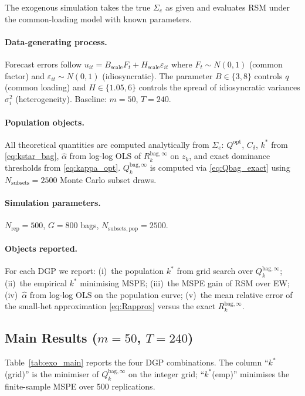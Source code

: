 \documentclass[12pt,a4paper]{article}
\theoremstyle{definition}
\begin{document}
The exogenous simulation takes the true $\Sigma_e$ as given and evaluates
RSM under the common-loading model with known parameters.

\paragraph{Data-generating process.}
Forecast errors follow $u_{it}=B_{\mathrm{scale}}F_t+H_{\mathrm{scale}}\varepsilon_{it}$
where $F_t\sim N(0,1)$ (common factor) and $\varepsilon_{it}\sim N(0,1)$
(idiosyncratic). The parameter $B\in\{3,8\}$ controls $q$ (common loading)
and $H\in\{1.05,6\}$ controls the spread of idiosyncratic variances
$\sigma_i^2$ (heterogeneity). Baseline: $m=50$, $T=240$.

\paragraph{Population objects.}
All theoretical quantities are computed analytically from $\Sigma_e$:
$Q^{\mathrm{opt}}$, $C_\delta$, $k^*$ from \eqref{eq:kstar_bag},
$\hat\alpha$ from log-log OLS of $R_k^{\mathrm{bag},\infty}$ on $z_k$,
and exact dominance thresholds from \eqref{eq:kappa_opt}.
$Q_k^{\mathrm{bag},\infty}$ is computed via \eqref{eq:Qbag_exact} using
$N_{\mathrm{subsets}}=2500$ Monte Carlo subset draws.

\paragraph{Simulation parameters.}
$N_{\mathrm{rep}}=500$, $G=800$ bags, $N_{\mathrm{subsets,pop}}=2500$.

\paragraph{Objects reported.}
For each DGP we report: (i)~the population $k^*$ from grid search over
$Q_k^{\mathrm{bag},\infty}$; (ii)~the empirical $k^*$ minimising MSPE;
(iii)~the MSPE gain of RSM over EW; (iv)~$\hat\alpha$ from log-log OLS
on the population curve; (v)~the mean relative error of the small-het
approximation \eqref{eq:Rapprox} versus the exact $R_k^{\mathrm{bag},\infty}$.

\subsection{Main Results ($m=50$, $T=240$)}

Table~\ref{tab:exo_main} reports the four DGP combinations. The column
``$k^*$(grid)'' is the minimiser of $Q_k^{\mathrm{bag},\infty}$ on the
integer grid; ``$k^*$(emp)'' minimises the finite-sample MSPE over 500
replications.
\end{document}
